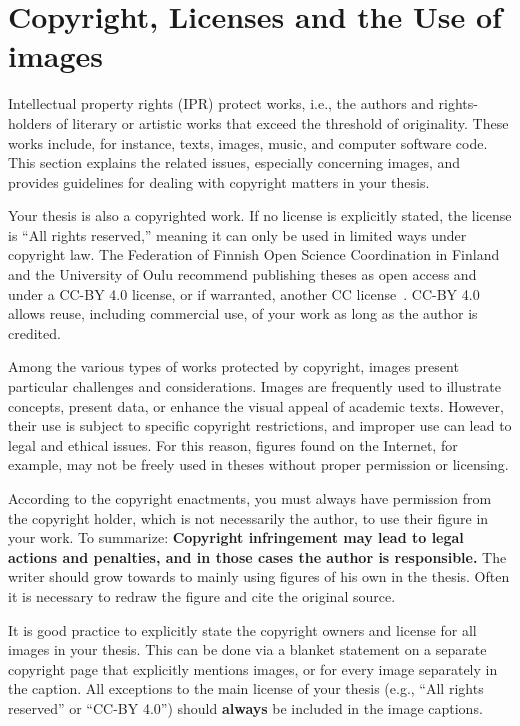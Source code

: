 \section{Copyright, Licenses and the Use of images}
\label{copyright}
Intellectual property rights (IPR) protect works, i.e., the authors
and rights-holders of literary or artistic works that exceed the
threshold of originality. These works include, for instance, texts,
images, music, and computer software code. This section explains the
related issues, especially concerning images, and provides guidelines
for dealing with copyright matters in your thesis.

Your thesis is also a copyrighted work. If no license is explicitly
stated, the license is \enquote{All rights reserved,} meaning it can only be
used in limited ways under copyright law. The Federation of Finnish
Open Science Coordination in Finland and the University of Oulu
recommend publishing theses as open access and under a CC-BY 4.0 license,
or if warranted, another CC license~\cite{coordination_open_2024}.
CC-BY 4.0 allows reuse, including commercial use, of your work as long as
the author is credited.

Among the various types of works protected by copyright, images
present particular challenges and considerations. Images are
frequently used to illustrate concepts, present data, or enhance the
visual appeal of academic texts. However, their use is subject to
specific copyright restrictions, and improper use can lead to legal
and ethical issues.  For this reason, figures found on the Internet,
for example, may not be freely used in theses without proper
permission or licensing.

According to the copyright enactments, you must always have
permission from the copyright holder, which is not necessarily the
author, to use their figure in your work. To summarize:
\textbf{Copyright infringement may lead to legal actions and
penalties, and in those cases the author is responsible.} The writer
should grow towards to mainly using figures of his own in the
thesis. Often it is necessary to redraw the figure and cite the
original source.

It is good practice to explicitly state the copyright owners and
license for all images in your thesis. This can be done via a blanket
statement on a separate copyright page that explicitly mentions
images, or for every image separately in the caption. All exceptions
to the main license of your thesis (e.g., \enquote{All rights reserved} or
\enquote{CC-BY 4.0}) should \textbf{always} be included in the image
captions.

